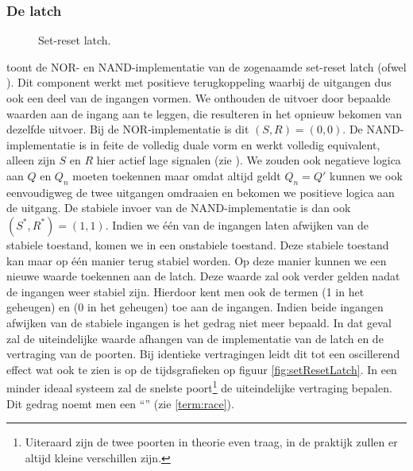 \subsubsection{De latch}
\begin{figure}[hbt]
\centering
{}
\caption{Set-reset latch.}
\end{figure}
 toont de NOR- en NAND-implementatie van de zogenaamde set-reset latch (ofwel ). Dit component werkt met positieve terugkoppeling waarbij de uitgangen dus ook een deel van de ingangen vormen. We onthouden de uitvoer door bepaalde waarden aan de ingang aan te leggen, die resulteren in het opnieuw bekomen van dezelfde uitvoer. Bij de NOR-implementatie is dit $\left(S,R\right)=\left(0,0\right)$. De NAND-implementatie is in feite de volledig duale vorm en werkt volledig equivalent, alleen zijn $S$ en $R$ hier actief lage signalen (zie ). We zouden ook negatieve logica aan $Q$ en $Q_n$ moeten toekennen maar omdat altijd geldt $Q_n=Q'$ kunnen we ook eenvoudigweg de twee uitgangen omdraaien en bekomen we positieve logica aan de uitgang. De stabiele invoer van de NAND-implementatie is dan ook $\left(S^*,R^*\right)=\left(1,1\right)$. Indien we \'e\'en van de ingangen laten afwijken van de stabiele toestand, komen we in een onstabiele toestand. Deze stabiele toestand kan maar op \'e\'en manier terug stabiel worden. Op deze manier kunnen we een nieuwe waarde toekennen aan de latch. Deze waarde zal ook verder gelden nadat de ingangen weer stabiel zijn. Hierdoor kent men ook de termen  (1 in het geheugen) en  (0 in het geheugen) toe aan de ingangen. Indien beide ingangen afwijken van de stabiele ingangen is het gedrag niet meer bepaald. In dat geval zal de uiteindelijke waarde afhangen van de implementatie van de latch en de vertraging van de poorten. Bij identieke vertragingen leidt dit tot een oscillerend effect wat ook te zien is op de tijdsgrafieken op figuur \ref{fig:setResetLatch}. In een minder ideaal systeem zal de snelste poort\footnote{Uiteraard zijn de twee poorten in theorie even traag, in de praktijk zullen er altijd kleine verschillen zijn.} de uiteindelijke vertraging bepalen. Dit gedrag noemt men een ``'' (zie \ref{term:race}).
